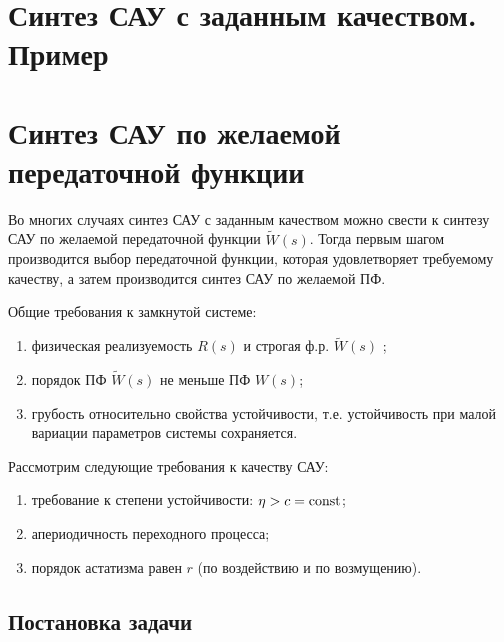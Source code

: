 \documentclass[../../TAU.tex]{subfiles}
\begin{document}
\section{Синтез САУ с заданным качеством. Пример}


\section{Синтез САУ по желаемой передаточной функции}

    Во многих случаях синтез САУ с заданным качеством можно свести к синтезу САУ по желаемой передаточной функции $\tilde W(s)$. Тогда первым шагом производится выбор передаточной функции, которая удовлетворяет требуемому качеству, а затем производится синтез САУ по желаемой ПФ.

    Общие требования к замкнутой системе:
    \begin{enumerate}
        \item 
            физическая реализуемость $R(s)$ и строгая ф.р. $\tilde W(s)$ ;
        \item 
            порядок ПФ $\tilde W(s)$ не меньше ПФ $W(s)$;
        \item 
            грубость относительно свойства устойчивости, т.е. устойчивость при малой вариации параметров системы сохраняется.
    \end{enumerate}
    Рассмотрим следующие требования к качеству САУ:
    \begin{enumerate}
      \item требование к степени устойчивости: $\eta > c=\mathop{\mathrm{const}}\nolimits$;
      \item апериодичность переходного процесса;
      \item порядок астатизма равен $r$ (по воздействию и по возмущению).
    \end{enumerate}

\subsection{Постановка задачи}
\end{document}

